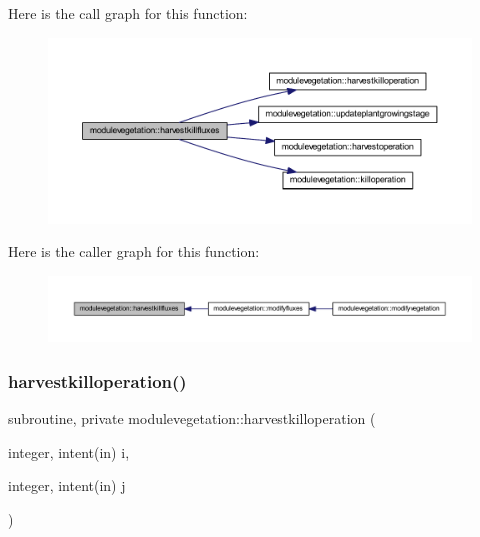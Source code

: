 Here is the call graph for this function\+:\nopagebreak
\begin{figure}[H]
\begin{center}
\leavevmode
\includegraphics[width=350pt]{namespacemodulevegetation_a68c29b5f11f8bae818809241e638e11a_cgraph}
\end{center}
\end{figure}
Here is the caller graph for this function\+:\nopagebreak
\begin{figure}[H]
\begin{center}
\leavevmode
\includegraphics[width=350pt]{namespacemodulevegetation_a68c29b5f11f8bae818809241e638e11a_icgraph}
\end{center}
\end{figure}
\mbox{\label{namespacemodulevegetation_a5b6084c4fb89b8ce3f29e23d6b623bef}} 
\subsubsection{\texorpdfstring{harvestkilloperation()}{harvestkilloperation()}}
{\footnotesize\ttfamily subroutine, private modulevegetation\+::harvestkilloperation (\begin{DoxyParamCaption}\item[{integer, intent(in)}]{i,  }\item[{integer, intent(in)}]{j }\end{DoxyParamCaption})\hspace{0.3cm}{\ttfamily [private]}}

